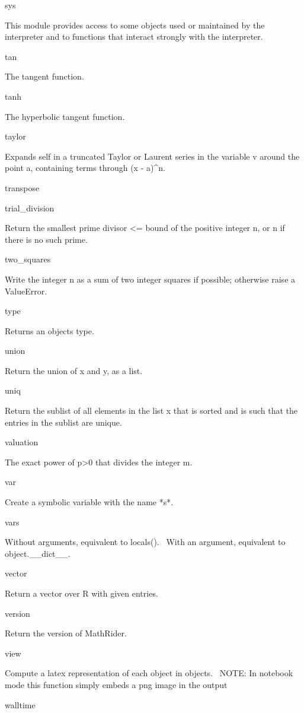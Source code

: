 \documentclass[12pt,twoside]{book}
\begin{document}
sys

This module provides access to some objects used or maintained by the interpreter and to functions that interact strongly with the interpreter.

tan

The tangent function.

tanh

The hyperbolic tangent function.

taylor

Expands self in a truncated Taylor or Laurent series in the variable v around the point a, containing terms through (x {}- a)\^{}n.

transpose


\bigskip

trial\_division

Return the smallest prime divisor {\textless}= bound of the positive integer n, or n if there is no such prime.

two\_squares

Write the integer n as a sum of two integer squares if possible; otherwise raise a ValueError.

type

Returns an object{\textquotesingle}s type.

union

Return the union of x and y, as a list.

uniq

Return the sublist of all elements in the list x that is sorted and is such that the entries in the sublist are unique.

valuation

The exact power of p{\textgreater}0 that divides the integer m.

var

Create a symbolic variable with the name *s*.

vars

Without arguments, equivalent to locals(). \ With an argument, equivalent to object.\_\_dict\_\_.

vector

Return a vector over R with given entries.

version

Return the version of MathRider.

view

Compute a latex representation of each object in objects. \ NOTE: In notebook mode this function simply embeds a png image in the output 

walltime
\end{document}
